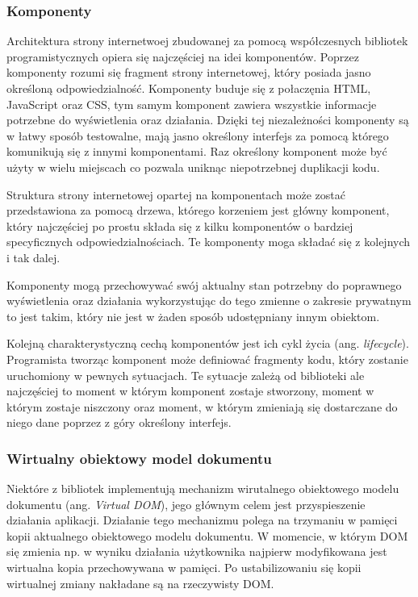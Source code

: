 \documentclass[polish, twoside, 12pt]{mwart}
\begin{document}
\subsubsection{Komponenty}

Architektura strony internetwoej zbudowanej za pomocą współczesnych bibliotek programistycznych opiera się najczęściej na idei komponentów. Poprzez komponenty rozumi się fragment strony internetowej, który posiada jasno określoną odpowiedzialność. Komponenty buduje się z połaczęnia HTML, JavaScript oraz CSS, tym samym komponent zawiera wszystkie informacje potrzebne do wyświetlenia oraz działania. Dzięki tej niezależności komponenty są w łatwy sposób testowalne, mają jasno określony interfejs za pomocą którego komunikują się z innymi komponentami. Raz określony komponent może być użyty w wielu miejscach co pozwala uniknąc niepotrzebnej duplikacji kodu.

Struktura strony internetowej opartej na komponentach może zostać przedstawiona za pomocą drzewa, którego korzeniem jest główny komponent, który najczęściej po prostu składa się z kilku komponentów o bardziej specyficznych odpowiedzialnościach. Te komponenty moga składać się z kolejnych i tak dalej. 

Komponenty mogą przechowywać swój aktualny stan potrzebny do poprawnego wyświetlenia oraz działania wykorzystując do tego zmienne o zakresie prywatnym to jest takim, który nie jest w żaden sposób udostępniany innym obiektom.

Kolejną charakterystyczną cechą komponentów jest ich cykl życia (ang. \emph{lifecycle}). Programista tworząc komponent może definiować fragmenty kodu, który zostanie uruchomiony w pewnych sytuacjach. Te sytuacje zależą od biblioteki ale najczęściej to moment w którym komponent zostaje stworzony, moment w którym zostaje niszczony oraz moment, w którym zmieniają się dostarczane do niego dane poprzez z góry określony interfejs.

\subsubsection{Wirtualny obiektowy model dokumentu}

Niektóre z bibliotek implementują mechanizm wirutalnego obiektowego modelu dokumentu (ang. \emph{ Virtual DOM}), jego głównym celem jest przyspieszenie działania aplikacji. Działanie tego mechanizmu polega na trzymaniu w pamięci kopii aktualnego obiektowego modelu dokumentu. W momencie, w którym DOM się zmienia np. w wyniku działania użytkownika najpierw modyfikowana jest wirtualna kopia przechowywana w pamięci. Po ustabilizowaniu się kopii wirtualnej zmiany nakładane są na rzeczywisty DOM.
\end{document}

